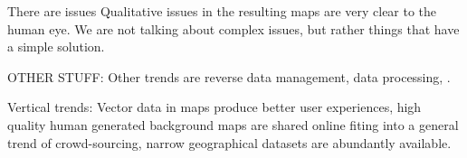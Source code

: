  There are issues Qualitative issues in the resulting maps are very clear to the human eye. We are not talking about complex issues, but rather things that have a simple solution.

OTHER STUFF: Other trends are reverse data management, data processing, .

Vertical trends: Vector data in maps \cite{apple,googlemaps} produce better user experiences, high quality human generated background maps are shared online \cite{openstreetmap,googlemaps,tilemill}  fiting into a general trend of crowd-sourcing, narrow geographical datasets are abundantly available.
